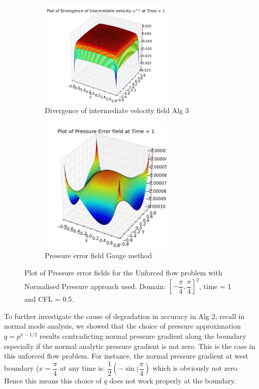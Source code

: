 \begin{figure}[H]
	\quad
	\begin{subfigure}[t]{2.5in}
		\centering
		\includegraphics[width=2.5in]{figures/Pm2_unf1_np_div_uvstar_t_1_grid_60.jpg}
		\caption{Divergence of intermediate velocity field Alg 3}\label{fig:6.19b}
	\end{subfigure}
	\quad
	\begin{subfigure}[t]{2.5in}
		\centering
		\includegraphics[width=2.5in]{figures/Gauge_unf1_P_error_t_1_grid_60.jpg}
		\caption{Pressure error field Gauge method }\label{fig:6.19b}
	\end{subfigure}
	\caption{Plot of Pressure error fields for the Unforced flow problem with Normalised Pressure approach used. Domain: $[-\dfrac{\pi}{4}, \dfrac{\pi}{4}]^2$, time = 1 and CFL = 0.5.}\label{fig:6.16}
\end{figure}

To further investigate the cause of degradation in accuracy in Alg 2, recall in normal mode analysis, we showed that the choice of pressure approximation $q = p^{n-1/2}$ results contradicting normal pressure gradient along the boundary especially if the normal analytic pressure gradient is not zero. This is the case in this unforced flow problem. For instance, the normal pressure gradient at west boundary ($x=\dfrac{\pi}{4}$ at any time is: $\dfrac{1}{2}\left(-\sin(\dfrac{\pi}{4}\right)$ which is obviously not zero. Hence this means this choice of $q$ does not work properly at the boundary.\\

